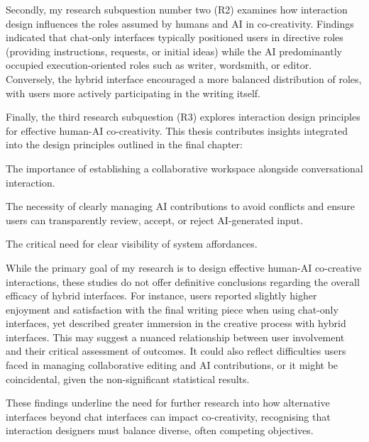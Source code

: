 Secondly, my research subquestion number two (R2) examines how interaction design influences the roles assumed by humans and AI in co-creativity. Findings indicated that chat-only interfaces typically positioned users in directive roles (providing instructions, requests, or initial ideas) while the AI predominantly occupied execution-oriented roles such as writer, wordsmith, or editor. Conversely, the hybrid interface encouraged a more balanced distribution of roles, with users more actively participating in the writing itself.

Finally, the third research subquestion (R3) explores interaction design principles for effective human-AI co-creativity. This thesis contributes insights integrated into the design principles outlined in the final chapter:

The importance of establishing a collaborative workspace alongside conversational interaction.

The necessity of clearly managing AI contributions to avoid conflicts and ensure users can transparently review, accept, or reject AI-generated input.

The critical need for clear visibility of system affordances.

While the primary goal of my research is to design effective human-AI co-creative interactions, these studies do not offer definitive conclusions regarding the overall efficacy of hybrid interfaces. For instance, users reported slightly higher enjoyment and satisfaction with the final writing piece when using chat-only interfaces, yet described greater immersion in the creative process with hybrid interfaces. This may suggest a nuanced relationship between user involvement and their critical assessment of outcomes. It could also reflect difficulties users faced in managing collaborative editing and AI contributions, or it might be coincidental, given the non-significant statistical results.

These findings underline the need for further research into how alternative interfaces beyond chat interfaces can impact co-creativity, recognising that interaction designers must balance diverse, often competing objectives.



